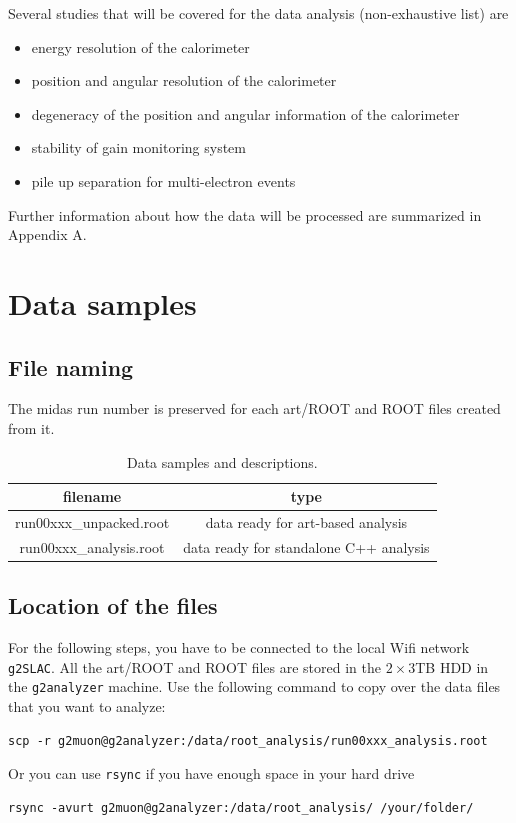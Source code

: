 \documentclass[12pt,letterpaper]{article}
\begin{document}
Several studies that will be covered for the data analysis (non-exhaustive list) are
\begin{itemize}
\item energy resolution of the calorimeter
\item position and angular resolution of the calorimeter
\item degeneracy of the position and angular information of the calorimeter
\item stability of gain monitoring system
\item pile up separation for multi-electron events
\end{itemize}

Further information about how the data will be processed are summarized in Appendix A.


\section{Data samples}

\subsection{File naming}

The midas run number is preserved for each art/ROOT and ROOT files created from it.  

\begin{table}[htbp]
\centering
\caption{Data samples and descriptions.}
\begin{tabular}{|c|c|} \hline 
filename & type \\ \hline 
run00xxx\_unpacked.root & data ready for art-based analysis \\ \hline 
run00xxx\_analysis.root & data ready for standalone C++ analysis \\ \hline 
\end{tabular} \label{tab:datasamples}
\end{table}

\subsection{Location of the files}

For the following steps, you have to be connected to the local Wifi network \verb+g2SLAC+.
All the art/ROOT and ROOT files are stored in the $2\times3$TB HDD in the \verb+g2analyzer+ machine.
Use the following command to copy over the data files that you want to analyze: 
%
\begin{lstlisting}[frame=single, basicstyle=\ttfamily\footnotesize]
scp -r g2muon@g2analyzer:/data/root_analysis/run00xxx_analysis.root
\end{lstlisting}
%
Or you can use \verb+rsync+ if you have enough space in your hard drive  
%
\begin{lstlisting}[frame=single, basicstyle=\ttfamily\footnotesize]
rsync -avurt g2muon@g2analyzer:/data/root_analysis/ /your/folder/
\end{lstlisting}
\end{document}
